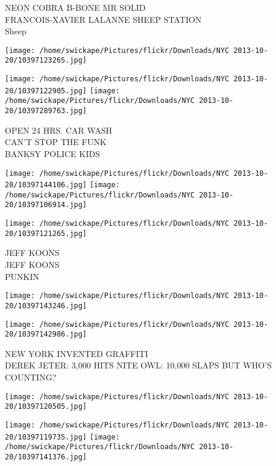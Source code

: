 \documentclass[10pt,letterpaper]{article}
\begin{document}
NEON COBRA B{-}BONE MR SOLID\\
FRANCOIS{-}XAVIER LALANNE SHEEP STATION\\
Sheep\\
\pagebreak

\texttt{[image: /home/swickape/Pictures/flickr/Downloads/NYC 2013-10-20/10397123265.jpg]}

\vspace{0.25in}
\texttt{[image: /home/swickape/Pictures/flickr/Downloads/NYC 2013-10-20/10397122905.jpg]}
\texttt{[image: /home/swickape/Pictures/flickr/Downloads/NYC 2013-10-20/10397289763.jpg]}

OPEN 24 HRS. CAR WASH\\
CAN'T STOP THE FUNK\\
BANKSY POLICE KIDS\\
\pagebreak

\texttt{[image: /home/swickape/Pictures/flickr/Downloads/NYC 2013-10-20/10397144106.jpg]}
\texttt{[image: /home/swickape/Pictures/flickr/Downloads/NYC 2013-10-20/10397106914.jpg]}

\vspace{0.25in}
\texttt{[image: /home/swickape/Pictures/flickr/Downloads/NYC 2013-10-20/10397121265.jpg]}

JEFF KOONS\\
JEFF KOONS\\
PUNKIN\\
\pagebreak

\texttt{[image: /home/swickape/Pictures/flickr/Downloads/NYC 2013-10-20/10397143246.jpg]}

\vspace{0.25in}
\texttt{[image: /home/swickape/Pictures/flickr/Downloads/NYC 2013-10-20/10397142986.jpg]}

NEW YORK INVENTED GRAFFITI\\
DEREK JETER: 3,000 HITS NITE OWL: 10,000 SLAPS BUT WHO'S COUNTING?\\
\pagebreak

\texttt{[image: /home/swickape/Pictures/flickr/Downloads/NYC 2013-10-20/10397120505.jpg]}

\vspace{0.25in}
\texttt{[image: /home/swickape/Pictures/flickr/Downloads/NYC 2013-10-20/10397119735.jpg]}
\texttt{[image: /home/swickape/Pictures/flickr/Downloads/NYC 2013-10-20/10397141376.jpg]}
\end{document}
